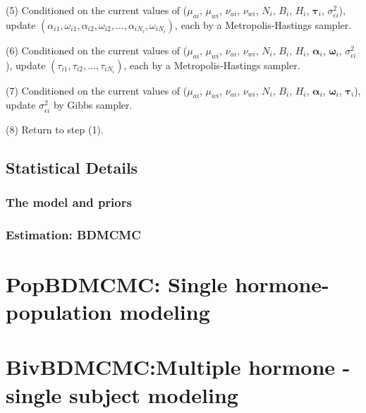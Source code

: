 \documentclass[11pt]{book}
\begin{document}
\noindent (5) Conditioned on the current values of ($\mu_{ai}$, $\mu_{wi}$, $\nu_{ai}$, $\nu_{wi}$, $N_i$, $B_i$, $H_i$, $\boldsymbol{\tau}_i$, $\sigma_{\epsilon i}^2$), update $(\alpha_{i1}, \omega_{i1}, \alpha_{i2}, \omega_{i2}, ... ,\alpha_{iN_i}, \omega_{iN_i})$, each by a Metropolis-Hastings sampler.

\noindent (6) Conditioned on the current values of ($\mu_{ai}$, $\mu_{wi}$, $\nu_{ai}$, $\nu_{wi}$, $N_i$, $B_i$, $H_i$, $\boldsymbol{\alpha}_i$, $\boldsymbol{\omega}_i$, $\sigma_{\epsilon i}^2$), update $(\tau_{i1},\tau_{i2},...,\tau_{iN_i})$, each by a Metropolis-Hastings sampler.

\noindent (7) Conditioned on the current values of ($\mu_{ai}$, $\mu_{wi}$, $\nu_{ai}$, $\nu_{wi}$, $N_i$, $B_i$, $H_i$, $\boldsymbol{\alpha}_i$, $\boldsymbol{\omega}_i$, $\boldsymbol{\tau}_i$), update $\sigma_{\epsilon i}^2$ by Gibbs sampler.

\noindent (8) Return to step (1).
\section{Statistical Details}
\subsection{The model and priors}

\subsection{Estimation: BDMCMC}
\chapter{PopBDMCMC: Single hormone-population modeling}
\chapter{BivBDMCMC:Multiple hormone -single subject modeling}
\end{document}
